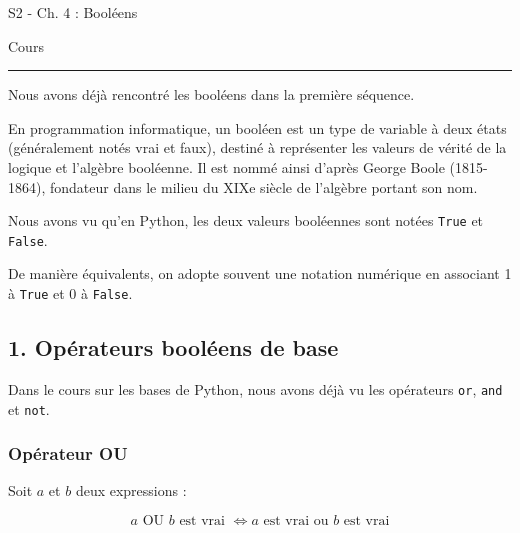 \documentclass[11pt,a4paper]{article}
\newenvironment{definition}[1]{\begin{tcolorbox}[title= {\color{NavyBlue} \faPencil*}~~\textbf{Définition #1}, colframe=NavyBlue, colback=white, colbacktitle=NavyBlue!10!white, coltitle=black, boxrule=0.1mm, titlerule=0mm]}{\end{tcolorbox}}
\begin{document}
    
    
     
    \chead{} 
    \cfoot{}
    \renewcommand{\headrulewidth}{0pt}
    \renewcommand{\footrulewidth}{0pt}

\Huge S2 - Ch. 4 : Booléens

\vspace{.25cm}
\normalsize Cours

\vspace{.25cm}
\hrule

\vspace{.5cm}


Nous avons déjà rencontré les booléens dans la première séquence.

En programmation informatique, un booléen est un type de variable à deux
états (généralement notés vrai et faux), destiné à représenter les
valeurs de vérité de la logique et l'algèbre booléenne. Il est nommé
ainsi d'après George Boole (1815-1864), fondateur dans le milieu du XIXe
siècle de l'algèbre portant son nom.

Nous avons vu qu'en Python, les deux valeurs booléennes sont notées
\texttt{True} et \texttt{False}.

De manière équivalents, on adopte souvent une notation numérique en
associant 1 à \texttt{True} et 0 à \texttt{False}.

\hypertarget{opuxe9rateurs-booluxe9ens-de-base}{%
\subsection*{1. Opérateurs booléens de
base}\label{opuxe9rateurs-booluxe9ens-de-base}}

Dans le cours sur les bases de Python, nous avons déjà vu les opérateurs
\texttt{or}, \texttt{and} et \texttt{not}.

\hypertarget{opuxe9rateur-ou}{%
\subsubsection*{Opérateur OU}\label{opuxe9rateur-ou}}

\begin{definition}{}

Soit \(a\) et \(b\) deux expressions :


$$a\textrm{ OU }b\textrm{ est vrai }\iff a\textrm{ est vrai ou }b\textrm{ est vrai}$$
\end{definition}
\end{document}
